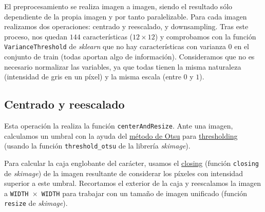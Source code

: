 \documentclass[a4]{article}
\begin{document}
El preprocesamiento se realiza
imagen a imagen, siendo el resultado sólo dependiente de la propia
imagen y por tanto paralelizable. Para cada imagen realizamos dos operaciones: centrado y reescalado, y downsampling. Tras este proceso, nos quedan $144$ características ($12 \times 12$) y comprobamos con la función \texttt{VarianceThreshold} de \textit{sklearn} que no hay características con varianza $0$ en el conjunto de train (todas aportan algo de información). Consideramos que no es necesario normalizar las variables, ya que todas tienen la misma naturaleza (intensidad de gris en un píxel) y la misma escala (entre $0$ y $1$).

\subsection{Centrado y reescalado}

Esta operación la realiza la función \texttt{centerAndResize}. Ante
una imagen, calculamos un umbral con la ayuda del \href{https://en.wikipedia.org/wiki/Otsu%27s_method}{método de Otsu}
  para
\href{https://en.wikipedia.org/wiki/Thresholding_(image_processing)}{thresholding} (usando la función \texttt{threshold\_otsu} de la librería \textit{skimage}). 

Para calcular la caja englobante del carácter, usamos el
\href{https://en.wikipedia.org/wiki/Closing_%28morphology%29}{closing}
  (función \texttt{closing} de \textit{skimage}) de la imagen
  resultante de considerar los píxeles con intensidad superior a este
  umbral. Recortamos el exterior de la caja y reescalamos la imagen a
  \texttt{WIDTH $\times$ WIDTH} para trabajar con un tamaño de imagen
  unificado (función \texttt{resize} de \textit{skimage}).

\end{document}
